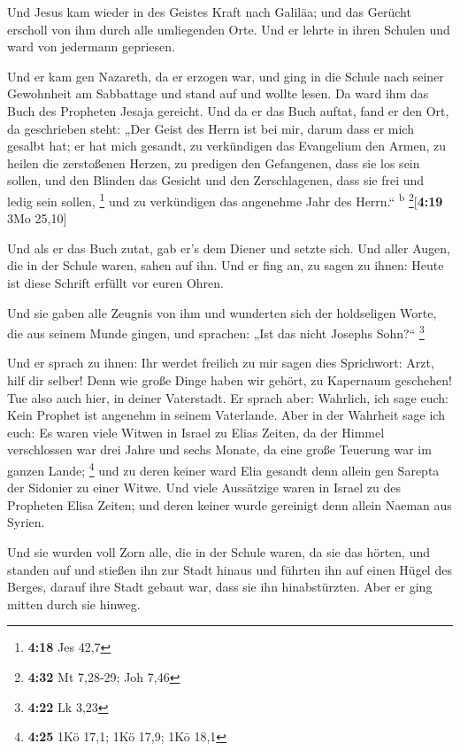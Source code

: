  Und Jesus kam wieder in des Geistes Kraft nach Galiläa;
und das Gerücht erscholl von ihm durch alle umliegenden Orte.
 Und er lehrte in ihren Schulen und ward von jedermann
gepriesen.

 Und er kam gen Nazareth, da er erzogen war, und ging in
die Schule nach seiner Gewohnheit am Sabbattage und stand auf und wollte
lesen.  Da ward ihm das Buch des Propheten Jesaja
gereicht. Und da er das Buch auftat, fand er den Ort, da geschrieben
steht:  „Der Geist des Herrn ist bei mir, darum dass er
mich gesalbt hat; er hat mich gesandt, zu verkündigen das Evangelium den
Armen, zu heilen die zerstoßenen Herzen, zu predigen den Gefangenen,
dass sie los sein sollen, und den Blinden das Gesicht und den
Zerschlagenen, dass sie frei und ledig sein sollen, \footnote{\textbf{4:18}
  Jes 42,7}  und zu verkündigen das angenehme Jahr des
Herrn.`` \textsuperscript{b} \footnote{\textbf{4:32} Mt 7,28-29; Joh
  7,46}{[}\textbf{4:19} 3Mo 25,10{]}

 Und als er das Buch zutat, gab er's dem Diener und
setzte sich. Und aller Augen, die in der Schule waren, sahen auf ihn.
 Und er fing an, zu sagen zu ihnen: Heute ist diese
Schrift erfüllt vor euren Ohren.

 Und sie gaben alle Zeugnis von ihm und wunderten sich
der holdseligen Worte, die aus seinem Munde gingen, und sprachen: „Ist
das nicht Josephs Sohn?{}`` \footnote{\textbf{4:22} Lk 3,23}

 Und er sprach zu ihnen: Ihr werdet freilich zu mir sagen
dies Sprichwort: Arzt, hilf dir selber! Denn wie große Dinge haben wir
gehört, zu Kapernaum geschehen! Tue also auch hier, in deiner
Vaterstadt.  Er sprach aber: Wahrlich, ich sage euch:
Kein Prophet ist angenehm in seinem Vaterlande.  Aber in
der Wahrheit sage ich euch: Es waren viele Witwen in Israel zu Elias
Zeiten, da der Himmel verschlossen war drei Jahre und sechs Monate, da
eine große Teuerung war im ganzen Lande; \footnote{\textbf{4:25} 1Kö
  17,1; 1Kö 17,9; 1Kö 18,1}  und zu deren keiner ward
Elia gesandt denn allein gen Sarepta der Sidonier zu einer Witwe.
 Und viele Aussätzige waren in Israel zu des Propheten
Elisa Zeiten; und deren keiner wurde gereinigt denn allein Naeman aus
Syrien.

 Und sie wurden voll Zorn alle, die in der Schule waren,
da sie das hörten,  und standen auf und stießen ihn zur
Stadt hinaus und führten ihn auf einen Hügel des Berges, darauf ihre
Stadt gebaut war, dass sie ihn hinabstürzten.  Aber er
ging mitten durch sie hinweg.

